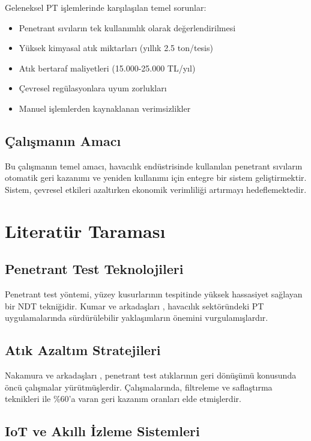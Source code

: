 \documentclass[12pt,a4paper]{article}
\begin{document}
Geleneksel PT işlemlerinde karşılaşılan temel sorunlar:

\begin{itemize}
\item Penetrant sıvıların tek kullanımlık olarak değerlendirilmesi
\item Yüksek kimyasal atık miktarları (yıllık 2.5 ton/tesis)
\item Atık bertaraf maliyetleri (15.000-25.000 TL/yıl)
\item Çevresel regülasyonlara uyum zorlukları \cite{european2019waste}
\item Manuel işlemlerden kaynaklanan verimsizlikler
\end{itemize}

\subsection{Çalışmanın Amacı}

Bu çalışmanın temel amacı, havacılık endüstrisinde kullanılan penetrant sıvıların otomatik geri kazanımı ve yeniden kullanımı için entegre bir sistem geliştirmektir. Sistem, çevresel etkileri azaltırken ekonomik verimliliği artırmayı hedeflemektedir.

\section{Literatür Taraması}

\subsection{Penetrant Test Teknolojileri}

Penetrant test yöntemi, yüzey kusurlarının tespitinde yüksek hassasiyet sağlayan bir NDT tekniğidir. Kumar ve arkadaşları \cite{kumar2021sustainable}, havacılık sektöründeki PT uygulamalarında sürdürülebilir yaklaşımların önemini vurgulamışlardır.

\subsection{Atık Azaltım Stratejileri}

Nakamura ve arkadaşları \cite{nakamura2020penetrant}, penetrant test atıklarının geri dönüşümü konusunda öncü çalışmalar yürütmüşlerdir. Çalışmalarında, filtreleme ve saflaştırma teknikleri ile \%60'a varan geri kazanım oranları elde etmişlerdir.

\subsection{IoT ve Akıllı İzleme Sistemleri}
\end{document}
